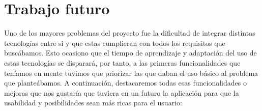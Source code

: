 
\cleardoublepage


\chapter{Trabajo futuro}
\label{makereference6}
Uno de los mayores problemas del proyecto fue la dificultad de integrar
 distintas tecnologías entre si y que estas cumplieran con todos los requisitos
 que buscábamos. Esto ocasiono que el tiempo de aprendizaje y adaptación del uso
 de estas tecnologías se disparará, por tanto, a las primeras funcionalidades que
 teníamos en mente tuvimos que priorizar las que daban el uso básico al problema
 que planteábamos.
A continuación, destacaremos todas esas funcionalidades o mejoras que nos
 gustaría que tuviera en un futuro la aplicación para que la usabilidad y
 posibilidades sean más ricas para el usuario:
